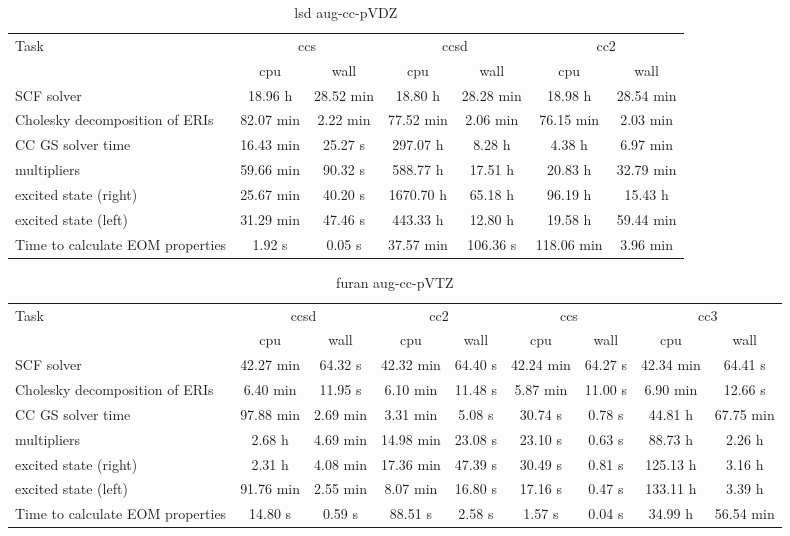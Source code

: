 \documentclass{article}
\begin{document}
\begin{table}
\caption{lsd aug-cc-pVDZ}
\begin{tabular}{lcccccc}
\toprule
Task & \multicolumn{2}{c}{ccs} & \multicolumn{2}{c}{ccsd} & \multicolumn{2}{c}{cc2}\\
\cmidrule(lr){2-3}\cmidrule(lr){4-5}\cmidrule(lr){6-7}
 & cpu & wall & cpu & wall & cpu & wall\\
\midrule
SCF solver & 18.96 h & 28.52 min & 18.80 h & 28.28 min & 18.98 h & 28.54 min\\
Cholesky decomposition of ERIs & 82.07 min & 2.22 min & 77.52 min & 2.06 min & 76.15 min & 2.03 min\\
CC GS solver time & 16.43 min & 25.27 s & 297.07 h & 8.28 h & 4.38 h & 6.97 min\\
multipliers & 59.66 min & 90.32 s & 588.77 h & 17.51 h & 20.83 h & 32.79 min\\
excited state (right) & 25.67 min & 40.20 s & 1670.70 h & 65.18 h & 96.19 h & 15.43 h\\
excited state (left) & 31.29 min & 47.46 s & 443.33 h & 12.80 h & 19.58 h & 59.44 min\\
Time to calculate EOM properties & 1.92 s & 0.05 s & 37.57 min & 106.36 s & 118.06 min & 3.96 min\\
\bottomrule
\end{tabular}
\end{table}
\begin{table}
\caption{furan aug-cc-pVTZ}
\begin{tabular}{lcccccccc}
\toprule
Task & \multicolumn{2}{c}{ccsd} & \multicolumn{2}{c}{cc2} & \multicolumn{2}{c}{ccs} & \multicolumn{2}{c}{cc3}\\
\cmidrule(lr){2-3}\cmidrule(lr){4-5}\cmidrule(lr){6-7}\cmidrule(lr){8-9}
 & cpu & wall & cpu & wall & cpu & wall & cpu & wall\\
\midrule
SCF solver & 42.27 min & 64.32 s & 42.32 min & 64.40 s & 42.24 min & 64.27 s & 42.34 min & 64.41 s\\
Cholesky decomposition of ERIs & 6.40 min & 11.95 s & 6.10 min & 11.48 s & 5.87 min & 11.00 s & 6.90 min & 12.66 s\\
CC GS solver time & 97.88 min & 2.69 min & 3.31 min & 5.08 s & 30.74 s & 0.78 s & 44.81 h & 67.75 min\\
multipliers & 2.68 h & 4.69 min & 14.98 min & 23.08 s & 23.10 s & 0.63 s & 88.73 h & 2.26 h\\
excited state (right) & 2.31 h & 4.08 min & 17.36 min & 47.39 s & 30.49 s & 0.81 s & 125.13 h & 3.16 h\\
excited state (left) & 91.76 min & 2.55 min & 8.07 min & 16.80 s & 17.16 s & 0.47 s & 133.11 h & 3.39 h\\
Time to calculate EOM properties & 14.80 s & 0.59 s & 88.51 s & 2.58 s & 1.57 s & 0.04 s & 34.99 h & 56.54 min\\
\bottomrule
\end{tabular}
\end{table}
\end{document}
